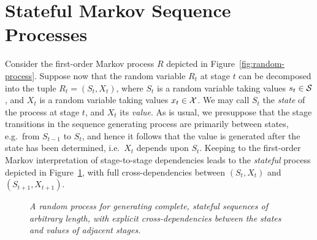 \documentclass[a4paper]{article}
\begin{document}
\section{Stateful Markov Sequence Processes}
Consider the first-order Markov process $R$ depicted in Figure~\ref{fig:random-process}.
Suppose now that the random variable $R_t$ at stage $t$ can be decomposed into the tuple
$R_t=(S_t,X_t)$, where $S_t$ is a random variable taking values $s_t\in{\cal S}$, and $X_t$
is a random variable taking values $x_t\in{\cal X}$.
We may call $S_t$ the {\em state} of the process at stage $t$, and $X_t$ its {\em value}.
As is usual, we presuppose that the stage transitions in the sequence generating process are primarily between states, e.g.\ from $S_{t-1}$ to $S_t$, 
and hence it follows that the value is generated after the state has been determined, i.e.\ $X_t$ depends upon $S_t$.
Keeping to the first-order Markov interpretation of stage-to-stage dependencies leads to
the {\em stateful} process depicted in Figure~\ref{fig:stateful-process}, with full cross-dependencies between $(S_t,X_t)$ and
$(S_{t+1},X_{t+1})$.
\begin{figure}[hbt]
\centering
{}
\caption{\em A random process for generating complete, stateful  sequences of arbitrary length,
with explicit cross-dependencies between the states and values of adjacent stages.}
\label{fig:stateful-process}
\end{figure}
\end{document}
